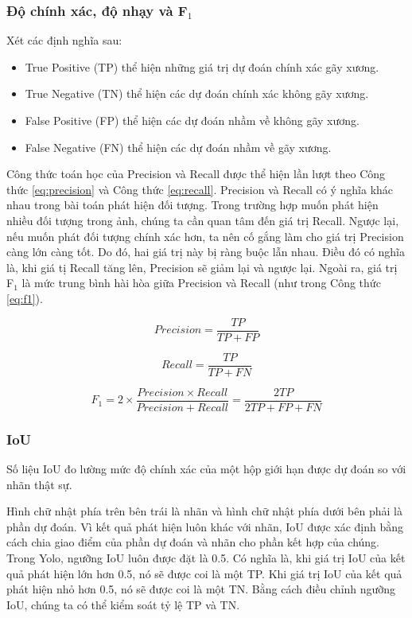 \documentclass[../the.tex]{subfiles}
\begin{document}
\subsubsection*{Độ chính xác, độ nhạy và F$_1$}

{\fontsize{13}{12} \selectfont
Xét các định nghĩa sau:
\begin {itemize}
  \item True Positive (TP) thể hiện những giá trị dự đoán chính xác gãy xương.
  \item True Negative (TN) thể hiện các dự đoán chính xác không gãy xương.
  \item False Positive (FP) thể hiện các dự đoán nhầm về không gãy xương.
  \item False Negative (FN) thể hiện các dự đoán nhầm về gãy xương.
\end {itemize}

Công thức toán học của Precision và Recall được thể hiện lần lượt theo Công thức \ref{eq:precision} và Công thức \ref{eq:recall}. Precision và Recall có ý nghĩa khác nhau trong bài toán phát hiện đối tượng. Trong trường hợp muốn phát hiện nhiều đối tượng trong ảnh, chúng ta cần quan tâm đến giá trị Recall. Ngược lại, nếu muốn phát đối tượng chính xác hơn, ta nên cố gắng làm cho giá trị Precision càng lớn càng tốt. Do đó, hai giá trị này bị ràng buộc lẫn nhau. Điều đó có nghĩa là, khi giá tị Recall tăng lên, Precision sẽ giảm lại và ngược lại. Ngoài ra, giá trị F$_1$ là mức trung bình hài hòa giữa Precision và Recall (như trong Công thức \ref{eq:f1}).
}

\begin{equation}
    Precision = \frac{TP}{TP + FP}
    \label{eq:precision}
\end{equation}

\begin{equation}
    Recall = \frac{TP}{TP + FN}
    \label{eq:recall}
\end{equation}

\begin{equation}
    F_1 = 2 \times \frac{Precision \times Recall}{Precision + Recall} = \frac{2TP}{2TP + FP + FN}
    \label{eq:f1}
\end{equation}

\subsubsection*{IoU}

{\fontsize{13}{12} \selectfont
Số liệu IoU đo lường mức độ chính xác của một hộp giới hạn được dự đoán so với nhãn thật sự. 

Hình chữ nhật phía trên bên trái là nhãn và hình chữ nhật phía dưới bên phải là phần dự đoán. Vì kết quả phát hiện luôn khác với nhãn, IoU được xác định bằng cách chia giao điểm của phần dự đoán và nhãn cho phần kết hợp của chúng. Trong Yolo, ngưỡng IoU luôn được đặt là 0.5. Có nghĩa là, khi giá trị IoU của kết quả phát hiện lớn hơn 0.5, nó sẽ được coi là một TP. Khi giá trị IoU của kết quả phát hiện nhỏ hơn 0.5, nó sẽ được coi là một TN. Bằng cách điều chỉnh ngưỡng IoU, chúng ta có thể kiểm soát tỷ lệ TP và TN.
}
\end{document}
